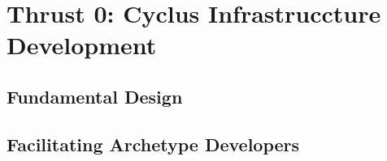 \chapter{Thrust 0: Cyclus Infrastruccture Development}\label{chap:thrust0}

\section{Fundamental Design} %

\section{Facilitating Archetype Developers} %

